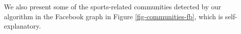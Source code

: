 We also present some of the sports-related communities detected by our algorithm in the Facebook graph in Figure \ref{fig-communities-fb}, which is self-explanatory.



%
%
%

